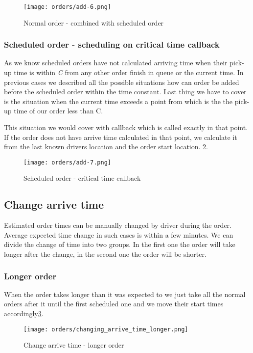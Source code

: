 	\begin{figure}[h]\centering
		\texttt{[image: orders/add-6.png]}
		\caption{Normal order - combined with scheduled order} 
		\label{order-process-normal-order-combined-with-scheduled}
	\end{figure} 

	\subsubsection{Scheduled order - scheduling on critical time callback}
	As we know scheduled orders have not calculated arriving time when their pick-up time is within \textit{C} from any other order finish in queue or the current time. In previous cases we described all the possible situations how can order be added before the scheduled order within the time constant. Last thing we have to cover is the situation when the current time exceeds a point from which is the the pick-up time of our order less than C.
	
	This situation we would cover with callback which is called exactly in that point. If the order does not have arrive time calculated in that point, we calculate it from the last known drivers location and the order start location. 
	 \ref{order-process-scheduled-critical-time}.

	\begin{figure}[h]\centering
		\texttt{[image: orders/add-7.png]}
		\caption{Scheduled order - critical time callback} 
		\label{order-process-scheduled-critical-time}
	\end{figure} 

\subsection{Change arrive time}
	Estimated order times can be manually changed by driver during the order. Average expected time change in such cases is within a few minutes. We can divide the change of time into two groups. In the first one the order will take longer after the change, in the second one the order will be shorter.
	
	\subsubsection{Longer order}
	When the order takes longer than it was expected to we just take all the normal orders after it until the first scheduled one and we move their start times accordingly\ref{order-process-change_longer}.
	\begin{figure}[h]\centering
		\texttt{[image: orders/changing\_arrive\_time\_longer.png]}
		\caption{Change arrive time - longer order} 
		\label{order-process-change_longer}
	\end{figure} 

